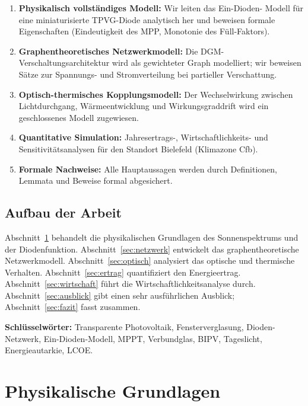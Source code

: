 ﻿\documentclass[a4paper,12pt]{article}
\theoremstyle{definition}
\theoremstyle{remark}
\begin{document}
\begin{enumerate}
  \item \textbf{Physikalisch vollständiges Modell:} Wir leiten das Ein-Dioden-
    Modell für eine miniaturisierte TPVG-Diode analytisch her und beweisen
    formale Eigenschaften (Eindeutigkeit des MPP, Monotonie des
    Füll-Faktors).

  \item \textbf{Graphentheoretisches Netzwerkmodell:} Die
    DGM-Verschaltungsarchitektur wird als gewichteter Graph modelliert; wir
    beweisen Sätze zur Spannungs- und Stromverteilung bei partieller Verschattung.

  \item \textbf{Optisch-thermisches Kopplungsmodell:} Der
    Wechselwirkung zwischen Lichtdurchgang, Wärmeentwicklung und
    Wirkungsgraddrift wird ein geschlossenes Modell zugewiesen.

  \item \textbf{Quantitative Simulation:} Jahresertrags-, Wirtschaftlichkeits-
    und Sensitivitätsanalysen für den Standort Bielefeld (Klimazone Cfb).

  \item \textbf{Formale Nachweise:} Alle Hauptaussagen werden durch
    Definitionen, Lemmata und Beweise formal abgesichert.
\end{enumerate}

\subsection{Aufbau der Arbeit}

Abschnitt~\ref{sec:physik} behandelt die physikalischen Grundlagen des
Sonnenspektrums und der Diodenfunktion. Abschnitt~\ref{sec:netzwerk} entwickelt
das graphentheoretische Netzwerkmodell. Abschnitt~\ref{sec:optisch} analysiert
das optische und thermische Verhalten. Abschnitt~\ref{sec:ertrag} quantifiziert
den Energieertrag. Abschnitt~\ref{sec:wirtschaft} führt die
Wirtschaftlichkeitsanalyse durch. Abschnitt~\ref{sec:ausblick} gibt einen sehr
ausführlichen Ausblick; Abschnitt~\ref{sec:fazit} fasst zusammen.

\textbf{Schlüsselwörter:} Transparente Photovoltaik, Fensterverglasung,
Dioden-Netzwerk, Ein-Dioden-Modell, MPPT, Verbundglas, BIPV,
Tageslicht, Energieautarkie, LCOE.

\section{Physikalische Grundlagen}
\label{sec:physik}
\end{document}
